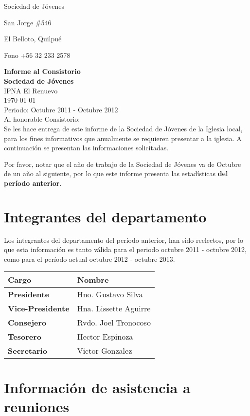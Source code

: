 \documentclass[12pt,letterpaper]{article}
\begin{document}
\hfill Sociedad de Jóvenes

\hfill San Jorge \#546

\hfill El Belloto, Quilpué

\hfill Fono +56 32 233 2578

\hfill \textbf{Informe al Consistorio}
\\
\textbf{Sociedad de Jóvenes} \\ IPNA El Renuevo \\  \today \\ Periodo: Octubre 2011 - Octubre 2012\\

Al honorable Consistorio:\\

Se les hace entrega de este informe de la Sociedad de Jóvenes de la Iglesia local, para los fines informativos que anualmente se requieren presentar a la iglesia. A continuación se presentan las informaciones solicitadas.

Por favor, notar que el año de trabajo de la Sociedad de Jóvenes va de Octubre de un año al siguiente, por lo que este informe presenta las estadísticas \textbf{del período anterior}.

\section{Integrantes del departamento}

Los integrantes del departamento del período anterior, han sido reelectos, por lo que esta información es tanto válida para el periodo octubre 2011 - octubre 2012, como para el período actual octubre 2012 - octubre 2013.

\begin{table}[!h]
\centering
\begin{tabular}{|l|l|}
\hline
\textbf{Cargo} & \textbf{Nombre} \\
\hline \hline
\textbf{Presidente} & Hno. Gustavo Silva \\ \hline
\textbf{Vice-Presidente} & Hna. Lissette Aguirre \\ \hline
\textbf{Consejero} & Rvdo. Joel Tronocoso \\ \hline
\textbf{Tesorero} & Hector Espinoza \\ \hline
\textbf{Secretario} & Victor Gonzalez \\ \hline
\end{tabular}
\end{table}

\newpage
\section{Información de asistencia a reuniones}
\end{document}
